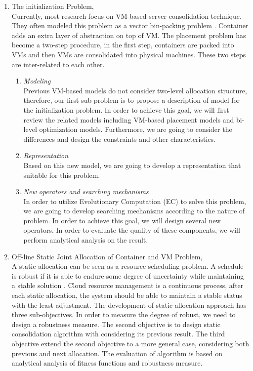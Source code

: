 \begin{enumerate}
	\item The initialization Problem, \\ 
	Currently, most research focus on VM-based server consolidation technique. They often modeled this problem as a vector bin-packing problem \cite{Zhang:2016cx}. Container adds an extra layer of abstraction on top of VM. The placement problem has become a two-step procedure, in the first step, containers are packed into VMs and then VMs are consolidated into physical machines. These two steps are inter-related to each other. 
	\begin{enumerate}
		\item \emph{Modeling} \\
		Previous VM-based models do not consider two-level allocation structure, therefore, our first sub problem is to propose a description of model for the initialization problem. In order to achieve this goal, we will first review the related models including VM-based placement models and bi-level optimization models. Furthermore, we are going to consider the differences and design the constraints and other characteristics.
		\item \emph{Representation} \\
		Based on this new model, we are going to develop a representation that suitable for this problem.
		\item \emph{New operators and searching mechanisms}\\
		In order to utilize Evolutionary Computation (EC) to solve this problem, we are going to develop searching mechanisms according to the nature of problem. In order to achieve this goal, we will design several new operators. In order to evaluate the quality of these components, we will perform analytical analysis on the result.
	\end{enumerate}

	\item Off-line Static Joint Allocation of Container and VM Problem, \\
	A static allocation can be seen as a resource scheduling problem. A schedule is robust if it is able to endure some degree of uncertainty while maintaining a stable solution \cite{Canon:2010go}. Cloud resource management is a continuous process, after each static allocation, the system should be able to maintain a stable status with the least adjustment. 
	The development of static allocation approach has three sub-objectives.
	In order to measure the degree of robust, we need to design a robustness measure. The second objective is to design static consolidation algorithm with considering its previous result. The third objective extend the second objective to a more general case, considering both previous and next allocation. The evaluation of algorithm is based on analytical analysis of fitness functions and robustness measure. 


\end{enumerate}
